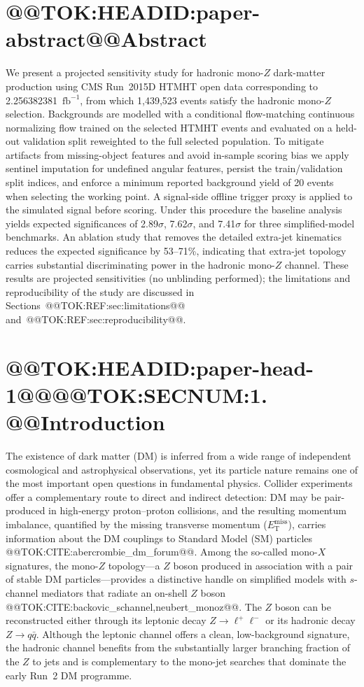 \documentclass[11pt]{article}
\makeatletter
\newcommand{\MET}{\ensuremath{E_{\mathrm{T}}^{\mathrm{miss}}}}
\newcommand{\invfb}{\ensuremath{\mathrm{fb}^{-1}}}
\newenvironment{abstract}{\section*{@@TOK:HEADID:paper-abstract@@Abstract}}{}
\makeatother
\begin{document}
\begin{abstract}
We present a projected sensitivity study for hadronic mono-$Z$ dark-matter
production using CMS Run~2015D HTMHT open data corresponding to
2.256382381~\invfb, from which 1{,}439{,}523 events satisfy the hadronic
mono-$Z$ selection. Backgrounds are modelled with a conditional flow-matching
continuous normalizing flow trained on the selected HTMHT events and
evaluated on a held-out validation split reweighted to the full selected
population. To mitigate artifacts from missing-object features and avoid
in-sample scoring bias we apply sentinel imputation for undefined angular
features, persist the train/validation split indices, and enforce a minimum
reported background yield of 20 events when selecting the working point. A
signal-side offline trigger proxy is applied to the simulated signal before
scoring. Under this procedure the baseline analysis yields expected
significances of 2.89$\sigma$, 7.62$\sigma$, and 7.41$\sigma$ for three
simplified-model benchmarks. An ablation study that removes the detailed
extra-jet kinematics reduces the expected significance by 53--71\%,
indicating that extra-jet topology carries substantial discriminating power
in the hadronic mono-$Z$ channel. These results are projected sensitivities
(no unblinding performed); the limitations and reproducibility of the study
are discussed in Sections~@@TOK:REF:sec:limitations@@ and~@@TOK:REF:sec:reproducibility@@.
\end{abstract}
\section{@@TOK:HEADID:paper-head-1@@@@TOK:SECNUM:1. @@Introduction}

The existence of dark matter (DM) is inferred from a wide range of
independent cosmological and astrophysical observations, yet its particle
nature remains one of the most important open questions in fundamental
physics. Collider experiments offer a complementary route to direct and
indirect detection: DM may be pair-produced in high-energy proton--proton
collisions, and the resulting momentum imbalance, quantified by the
missing transverse momentum (\MET), carries information about the DM
couplings to Standard Model (SM) particles @@TOK:CITE:abercrombie_dm_forum@@.
Among the so-called mono-$X$ signatures, the mono-$Z$ topology---a $Z$
boson produced in association with a pair of stable DM particles---provides
a distinctive handle on simplified models with $s$-channel mediators that
radiate an on-shell $Z$ boson @@TOK:CITE:backovic_schannel,neubert_monoz@@. The
$Z$ boson can be reconstructed either through its leptonic decay
$Z\to\ell^{+}\ell^{-}$ or its hadronic decay $Z\to q\bar{q}$. Although the
leptonic channel offers a clean, low-background signature, the hadronic
channel benefits from the substantially larger branching fraction of the
$Z$ to jets and is complementary to the mono-jet searches that dominate the
early Run~2 DM programme.
\end{document}
